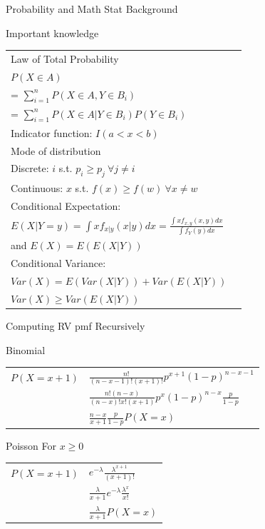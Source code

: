 \documentclass[a4paper,12pt,landscape]{article}
\begin{document}
\begin{multicols}{3}
\begin{section}{\small{Probability and Math Stat Background}}
	\begin{subsection}{Important knowledge}
		\begin{tabulary}{\linewidth}{l L}
			Law of Total Probability  \\$P(X \in A)$ \\ 
			= $\sum_{i=1}^nP(X \in A, Y \in B_i)$ \\
			 = $\sum_{i=1}^n P(X\in A|Y \in B_i)P(Y \in B_i)$ \\
			 Indicator function: $I(a < x < b)$ \\
			 Mode of distribution\\
			 Discrete: $i$ s.t. $p_i \geq p_j~\forall j \neq i$\\
			 Continuous: $x$ s.t. $f(x) \geq f(w)~\forall x\neq w$\\
			 Conditional Expectation: \\ 
             $E(X|Y = y) = \int xf_{x|y}(x|y) dx = \frac{\int xf_{x,y}(x, y) dx}{\int f_Y(y) dx}$\\
			 and $E(X) = E(E(X|Y))$ \\
			 Conditional Variance: \\
			 $Var(X) = E(Var(X|Y)) + Var(E(X|Y))$ \\
			 $Var(X) \geq Var(E(X|Y))$
		\end{tabulary}
	\end{subsection}

	\begin{subsection}{Computing RV pmf Recursively}
		\begin{subsubsection}{Binomial}
			\begin{tabulary}{\linewidth}{l @{ = } l}
				$P(X = x+1)$  & $ \frac{n!}{(n-x-1)!(x+1)!}p^{x+1}(1-p)^{n-x-1}$ \\
				& $\frac{n!(n-x)}{(n-x)!x!(x+1)}p^x(1-p)^{n-x}\frac{p}{1-p}$ \\
				& $\frac{n-x}{x+1}\frac{p}{1-p}P(X=x)$
			\end{tabulary}
		\end{subsubsection}
		
		\begin{subsubsection}{Poisson}
			For $x\geq 0$ \\
			\begin{tabulary}{\linewidth}{l @{ = } l}
				$P(X = x+1)$ & $e^{-\lambda}\frac{\lambda^{x+1}}{(x+1)!}$ \\
				& $\frac{\lambda}{x+1}e^{-\lambda}\frac{\lambda^x}{x!}$ \\
				& $\frac{\lambda}{x+1}P(X=x)$
			\end{tabulary}
		\end{subsubsection}
	\end{subsection}


\end{section}
\end{multicols}
\end{document}
